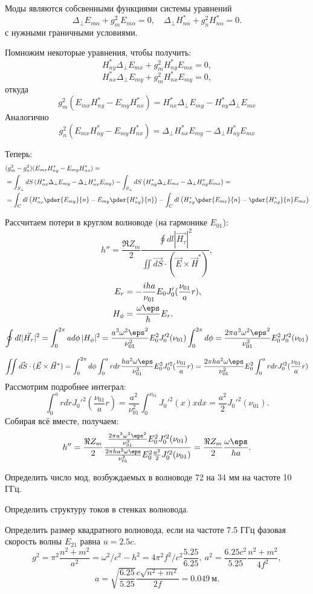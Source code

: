 Моды являются собсвенными функциями системы уравнений
\[
	\Delta_\perp E_{m\alpha} + g_m^2 E_{m\alpha} = 0,\quad \Delta_\perp H_{n\alpha}^* + g_n^2 H_{n\alpha}^* = 0.
\]
с нужными граничными условиями.

Помножим некоторые уравнения, чтобы получить:
\[
	H_{ny}^*\Delta_\perp E_{mx} + g_m^2 H_{ny}^*E_{mx} = 0,
\]
\[
	H_{nx}^*\Delta_\perp E_{my} + g_m^2 H_{nx}^*E_{my} = 0,
\]
откуда
\[
	g_m^2(E_{mx}H_{ny}^* - E_{my}H_{nx}^*) = H_{nx}^*\Delta_\perp E_{my} - H_{ny}^*\Delta_\perp E_{mx}
\]
Аналогично
\[
	g_n^2(E_{mx}H_{ny}^* - E_{my}H_{nx}^*) = \Delta_\perp H_{nx}^* E_{my} - \Delta_\perp H_{ny}^* E_{mx}
\]

Теперь:
\begin{align*}
	&(g_m^2 - g_n^2)(E_{mx}H_{ny}^* - E_{my}H_{nx}^*) =\\
	& = \int_{S_\perp} dS \left( H_{nx}^*\Delta_\perp E_{my} - \Delta_\perp H_{nx}^* E_{my} \right)
	-
	\int_{S_\perp} dS \left( H_{ny}^*\Delta_\perp E_{mx} - \Delta_\perp H_{ny}^* E_{mx} \right) =\\
	& = \int_C dl \left(H_{nx}^* \pder{E_{my}}{n} - E_{my}\pder{H_{ny}^*}{n}\right) -
	\int_C dl \left( H_{ny}^*\pder{E_{mx}}{n} - \pder{H_{ny}^*}{n} E_{mx} \right)
\end{align*}


Рассчитаем потери в круглом волноводе (на гармонике \(E_{01}\)):
\[
	h'' = \frac{\Re Z_m}{2}\frac{\oint dl |\vec{H_\tau}|^2}{\iint \vec{dS}\cdot(\vec{E}\times\vec{H}^*)},
\]
\begin{align*}
	E_r &= -\frac{iha}{\nu_{01}}E_0 J_0'(\frac{\nu_{01}}{a}r),\\
	H_\phi &= \frac{\omega\eps}{h}E_r.
\end{align*}
\[
	\oint dl |\vec{H_\tau}|^2 = \int_0^{2\pi} a d\phi\,|H_\phi|^2 =
	\frac{a^3\omega^2\eps^2}{\nu_{01}^2}E_0^2J_0'^2(\nu_{01})\int_0^{2\pi} d\phi = \frac{2\pi a^3\omega^2\eps^2}{\nu_{01}^2}E_0^2J_0'^2(\nu_{01})
\]

\[
	\iint \vec{dS}\cdot(\vec{E}\times\vec{H}^*) = \int_0^{2\pi}d\phi\int_0^a rdr \frac{ha^2\omega\eps}{\nu_{01}^2}E_0^2J_0'^2(\frac{\nu_{01}}{a}r)= \frac{2\pi ha^2\omega\eps}{\nu_{01}^2}E_0^2 \int_0^a rdrJ_0'^2(\frac{\nu_{01}}{a}r)
\]
Рассмотрим подробнее интеграл:
\[
	\int_0^a rdr J_0'^2(\frac{\nu_{01}}{a}r) =
	\frac{a^2}{\nu_{01}^2}\int_0^{\nu_{01}} J_0'^2(x) x dx =
	\frac{a^2}{2}J_0'^2(\nu_{01}).
\]
Собирая всё вместе, получаем:
\[
	h'' = \frac{\Re Z_m}{2}\frac{\frac{2\pi a^3\omega^2\eps^2}{\nu_{01}^2}E_0^2J_0'^2(\nu_{01})}{\frac{2\pi ha^2\omega\eps}{\nu_{01}^2}E_0^2\frac{a^2}{2}J_0'^2(\nu_{01})} = \frac{\Re Z_m}{2}\frac{\omega\eps}{ha}.
\]

Определить число мод, возбуждаемых в волноводе 72 на 34 мм на частоте 10 ГГц.

Определить структуру токов в стенках волновода.

Определить размер квадратного волновода, если на частоте 7.5 ГГц фазовая скорость волны \(E_{21}\) равна \( u = 2.5c \).
\[
	g^2 = \pi^2\frac{n^2 + m^2}{a^2} = \omega^2/c^2 - h^2 = 4\pi^2f^2/c^2 \frac{5.25}{6.25},\ a^2 = \frac{6.25 c^2}{5.25}\frac{n^2 + m^2}{4f^2},
\]
\[
	a = \sqrt{\frac{6.25}{5.25}}\frac{c\sqrt{n^2 + m^2}}{2f} = 0.049~\text{м}.
\]